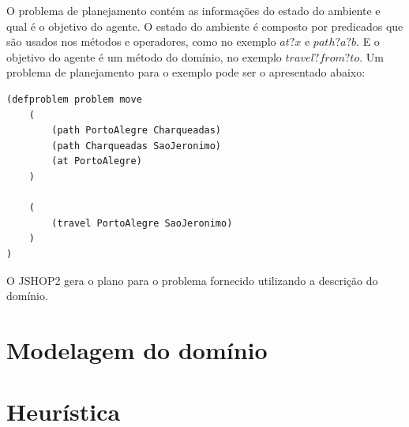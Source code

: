 O problema de planejamento contém as informações do estado do ambiente e qual é o objetivo do agente. 
O estado do ambiente é composto por predicados que são usados nos métodos e operadores, como no exemplo $at ?x$ e $path ?a ?b$. E o objetivo do agente é um método do domínio, no exemplo $travel ?from ?to$. Um problema de planejamento para o exemplo pode ser o apresentado abaixo:


\begin{lstlisting}[language=lisp]
(defproblem problem move
	( 
		(path PortoAlegre Charqueadas)
		(path Charqueadas SaoJeronimo)
		(at PortoAlegre)
	)
	
	(
		(travel PortoAlegre SaoJeronimo)
	)
)
\end{lstlisting}

O JSHOP2 gera o plano para o problema fornecido utilizando a descrição do domínio. 


\section{Modelagem do domínio}

\section{Heurística}


